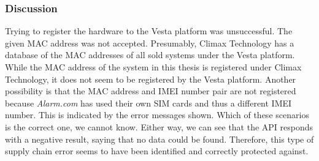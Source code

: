 \subsubsection{Discussion}
Trying to register the hardware to the Vesta platform was unsuccessful. The given MAC address was not accepted. Presumably, Climax Technology has a database of the MAC addresses of all sold systems under the Vesta platform. While the MAC address of the system in this thesis is registered under Climax Technology, it does not seem to be registered by the Vesta platform. Another possibility is that the MAC address and IMEI number pair are not registered because \textit{Alarm.com} has used their own SIM cards and thus a different IMEI number. This is indicated by the error messages shown. Which of these scenarios is the correct one, we cannot know. Either way, we can see that the API responds with a negative result, saying that no data could be found. Therefore, this type of supply chain error seems to have been identified and correctly protected against.
